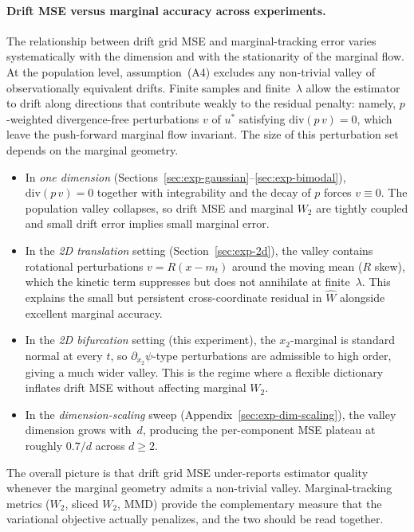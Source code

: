 \documentclass[11pt,leqno]{article}
\theoremstyle{plain}
\theoremstyle{remark}
\theoremstyle{definition}
\numberwithin{equation}{section}
\numberwithin{figure}{section}
\numberwithin{table}{section}
\begin{document}
\paragraph{Drift MSE versus marginal accuracy across experiments.}
\label{par:valley-summary}
The relationship between drift grid MSE and marginal-tracking error
varies systematically with the dimension and with the stationarity
of the marginal flow.  At the population level, assumption~(A4)
excludes any non-trivial valley of observationally equivalent drifts.
Finite samples and finite~$\lambda$ allow the estimator to drift
along directions that contribute weakly to the residual penalty:
namely, $p$-weighted divergence-free perturbations $v$ of $u^{\!*}$
satisfying $\mathrm{div}(p\,v)=0$, which leave the push-forward
marginal flow invariant.  The size of this perturbation set depends
on the marginal geometry.
\begin{itemize}
  \item In \emph{one dimension}
        (Sections~\ref{sec:exp-gaussian}--\ref{sec:exp-bimodal}),
        $\mathrm{div}(p\,v)=0$ together with integrability and the
        decay of $p$ forces $v\equiv 0$.  The population valley
        collapses, so drift MSE and marginal $W_2$ are tightly coupled
        and small drift error implies small marginal error.
  \item In the \emph{2D translation} setting
        (Section~\ref{sec:exp-2d}), the valley contains rotational
        perturbations $v=R(x-m_t)$ around the moving mean ($R$ skew),
        which the kinetic term suppresses but does not annihilate at
        finite~$\lambda$.  This explains the small but persistent
        cross-coordinate residual in $\widehat W$ alongside excellent
        marginal accuracy.
  \item In the \emph{2D bifurcation} setting (this experiment), the
        $x_2$-marginal is standard normal at every $t$, so
        $\partial_{x_2}\psi$-type perturbations are admissible to high
        order, giving a much wider valley.  This is the regime where
        a flexible dictionary inflates drift MSE without affecting
        marginal $W_2$.
  \item In the \emph{dimension-scaling} sweep
        (Appendix~\ref{sec:exp-dim-scaling}), the valley dimension
        grows with~$d$, producing the per-component MSE plateau at
        roughly $0.7/d$ across $d\ge 2$.
\end{itemize}
The overall picture is that drift grid MSE under-reports estimator
quality whenever the marginal geometry admits a non-trivial valley.
Marginal-tracking metrics ($W_2$, sliced $W_2$, MMD) provide the
complementary measure that the variational objective actually
penalizes, and the two should be read together.
\end{document}
